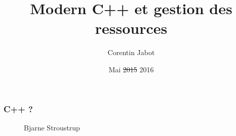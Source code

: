 \documentclass[xetex,mathserif]{beamer}
\title{Modern C++ et gestion des ressources}
\author{Corentin Jabot}
\date{Mai \st{2015} 2016 }
\begin{document}
\NoAutoSpacing

\begin{frame}
\titlepage
\end{frame}


\begin{frame}
\frametitle{C++ ?}
\begin{figure}
  Bjarne Stroustrup
\end{figure}
\end{frame}
\end{document}
